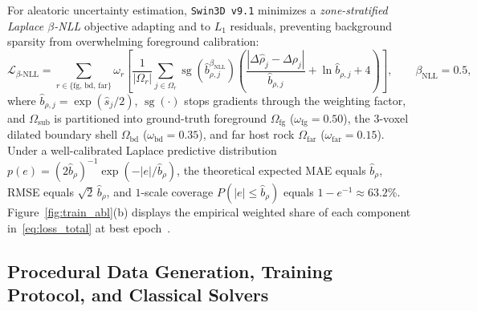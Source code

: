 \documentclass[11pt,a4paper]{article}
\begin{document}
For aleatoric uncertainty estimation, \texttt{Swin3D v9.1} minimizes a \emph{zone-stratified Laplace $\beta$-NLL} objective adapting \citet{seitzer2022betanll} and \citet{kendall2017} to $L_1$ residuals, preventing background sparsity from overwhelming foreground calibration:
\begin{equation}
  \mathcal{L}_{\beta\text{-NLL}} = \sum_{r \in \{\mathrm{fg},\,\mathrm{bd},\,\mathrm{far}\}} \omega_r \left[
    \frac{1}{|\Omega_r|} \sum_{j \in \Omega_r} \operatorname{sg}\!\left(\hat{b}_{\rho,j}^{\beta_{\mathrm{NLL}}}\right)
    \left( \frac{|\Delta\hat{\rho}_j - \Delta\rho_j|}{\hat{b}_{\rho,j}} + \ln\hat{b}_{\rho,j} + 4 \right)
  \right], \qquad \beta_{\mathrm{NLL}} = 0.5,
  \label{eq:betanll}
\end{equation}
where $\hat{b}_{\rho,j} = \exp(\hat{s}_j/2)$, $\operatorname{sg}(\cdot)$ stops gradients through the weighting factor, and $\Omega_{\mathrm{sub}}$ is partitioned into ground-truth foreground $\Omega_{\mathrm{fg}}$ ($\omega_{\mathrm{fg}} = 0.50$), the 3-voxel dilated boundary shell $\Omega_{\mathrm{bd}}$ ($\omega_{\mathrm{bd}} = 0.35$), and far host rock $\Omega_{\mathrm{far}}$ ($\omega_{\mathrm{far}} = 0.15$). Under a well-calibrated Laplace predictive distribution $p(e) = (2\hat{b}_\rho)^{-1}\exp(-|e|/\hat{b}_\rho)$, the theoretical expected MAE equals $\hat{b}_\rho$, RMSE equals $\sqrt{2}\,\hat{b}_\rho$, and $1$-scale coverage $P(|e| \le \hat{b}_\rho)$ equals $1 - e^{-1} \approx 63.2\%$. Figure~\ref{fig:train_abl}(b) displays the empirical weighted share of each component in~\eqref{eq:loss_total} at best epoch~\valVNineOneEp{}.

\subsection{Procedural Data Generation, Training Protocol, and Classical Solvers}
\label{sec:classical}
\end{document}
